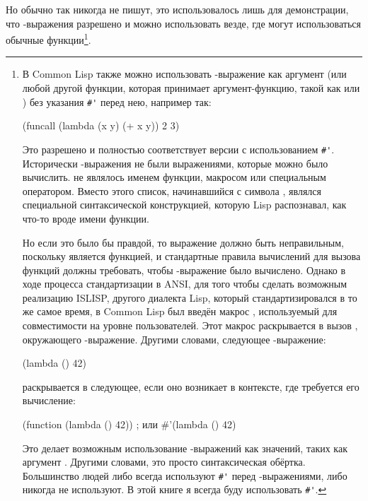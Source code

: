 Но обычно так никогда не пишут, это использовалось лишь для демонстрации, что
-выражения разрешено и можно использовать везде, где могут использоваться
обычные функции\footnote{В Common Lisp также можно использовать
-выражение как аргумент  (или любой другой функции, которая
принимает аргумент-функцию, такой как  или ) без указания
\lstinline!#'! перед нею, например так:

\begin{myverb}
  (funcall (lambda (x y) (+ x y)) 2 3)
\end{myverb}

Это разрешено и полностью соответствует версии с использованием \lstinline!#'!.  Исторически
-выражения не были выражениями, которые можно было вычислить.  
не являлось именем функции, макросом или специальным оператором.  Вместо этого список,
начинавшийся с символа , являлся специальной синтаксической конструкцией,
которую Lisp распознавал, как что-то вроде имени функции.

Но если это было бы правдой, то выражение  должно быть
неправильным, поскольку  является функцией, и стандартные правила вычислений
для вызова функций должны требовать, чтобы -выражение было вычислено.
Однако в ходе процесса стандартизации в ANSI, для того чтобы сделать возможным реализацию
ISLISP, другого диалекта Lisp, который стандартизировался в то же самое время, в Common
Lisp был введён макрос , используемый для совместимости на уровне
пользователей.  Этот макрос раскрывается в вызов , окружающего
-выражение.  Другими словами, следующее -выражение:

\begin{myverb}
  (lambda () 42)
\end{myverb}

\noindent{}раскрывается в следующее, если оно возникает в контексте, где требуется его вычисление:

\begin{myverb}
  (function (lambda () 42))   ; или #'(lambda () 42)
\end{myverb}

Это делает возможным использование -выражений как значений, таких как
аргумент .  Другими словами, это просто синтаксическая обёртка.  Большинство
людей либо всегда используют \lstinline!#'! перед -выражениями, либо никогда
не используют.  В этой книге я всегда буду использовать \lstinline!#'!.}.

